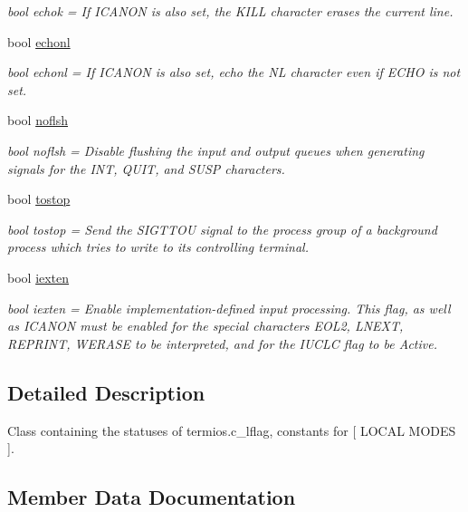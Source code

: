 \begin{DoxyCompactItemize}
\begin{DoxyCompactList}\small\item\em bool echok = If I\+C\+A\+N\+ON is also set, the K\+I\+LL character erases the current line. \end{DoxyCompactList}\item 
bool \hyperlink{classport_1_1localFlags_a2a27e1978747d34ee03ea71ca0af2818}{echonl}
\begin{DoxyCompactList}\small\item\em bool echonl = If I\+C\+A\+N\+ON is also set, echo the NL character even if E\+C\+HO is not set. \end{DoxyCompactList}\item 
bool \hyperlink{classport_1_1localFlags_a889a392c648e398126db96326ac44114}{noflsh}
\begin{DoxyCompactList}\small\item\em bool noflsh = Disable flushing the input and output queues when generating signals for the I\+NT, Q\+U\+IT, and S\+U\+SP characters. \end{DoxyCompactList}\item 
bool \hyperlink{classport_1_1localFlags_a12ac0107b1732e3299333926fdc4829e}{tostop}
\begin{DoxyCompactList}\small\item\em bool tostop = Send the S\+I\+G\+T\+T\+OU signal to the process group of a background process which tries to write to its controlling terminal. \end{DoxyCompactList}\item 
bool \hyperlink{classport_1_1localFlags_a07fb7cb6582c8b074a20461f5702ac35}{iexten}
\begin{DoxyCompactList}\small\item\em bool iexten = Enable implementation-\/defined input processing. This flag, as well as I\+C\+A\+N\+ON must be enabled for the special characters E\+O\+L2, L\+N\+E\+XT, R\+E\+P\+R\+I\+NT, W\+E\+R\+A\+SE to be interpreted, and for the I\+U\+C\+LC flag to be Active. \end{DoxyCompactList}\end{DoxyCompactItemize}


\subsection{Detailed Description}
Class containing the statuses of termios.\+c\+\_\+lflag, constants for \mbox{[} L\+O\+C\+AL M\+O\+D\+ES \mbox{]}. 

\subsection{Member Data Documentation}
